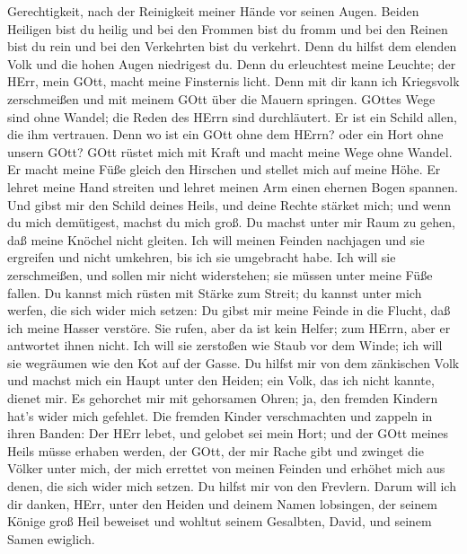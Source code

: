 Gerechtigkeit, nach der Reinigkeit meiner Hände vor seinen Augen.
 Beiden Heiligen bist du heilig und bei den Frommen bist du
fromm  und bei den Reinen bist du rein und bei den
Verkehrten bist du verkehrt.  Denn du hilfst dem elenden
Volk und die hohen Augen niedrigest du.  Denn du
erleuchtest meine Leuchte; der HErr, mein GOtt, macht meine Finsternis
licht.  Denn mit dir kann ich Kriegsvolk zerschmeißen und
mit meinem GOtt über die Mauern springen.  GOttes Wege sind
ohne Wandel; die Reden des HErrn sind durchläutert. Er ist ein Schild
allen, die ihm vertrauen.  Denn wo ist ein GOtt ohne dem
HErrn? oder ein Hort ohne unsern GOtt?  GOtt rüstet mich
mit Kraft und macht meine Wege ohne Wandel.  Er macht meine
Füße gleich den Hirschen und stellet mich auf meine Höhe. 
Er lehret meine Hand streiten und lehret meinen Arm einen ehernen Bogen
spannen.  Und gibst mir den Schild deines Heils, und deine
Rechte stärket mich; und wenn du mich demütigest, machst du mich groß.
 Du machst unter mir Raum zu gehen, daß meine Knöchel nicht
gleiten.  Ich will meinen Feinden nachjagen und sie
ergreifen und nicht umkehren, bis ich sie umgebracht habe. 
Ich will sie zerschmeißen, und sollen mir nicht widerstehen; sie müssen
unter meine Füße fallen.  Du kannst mich rüsten mit Stärke
zum Streit; du kannst unter mich werfen, die sich wider mich setzen:
 Du gibst mir meine Feinde in die Flucht, daß ich meine
Hasser verstöre.  Sie rufen, aber da ist kein Helfer; zum
HErrn, aber er antwortet ihnen nicht.  Ich will sie
zerstoßen wie Staub vor dem Winde; ich will sie wegräumen wie den Kot
auf der Gasse.  Du hilfst mir von dem zänkischen Volk und
machst mich ein Haupt unter den Heiden; ein Volk, das ich nicht kannte,
dienet mir.  Es gehorchet mir mit gehorsamen Ohren; ja, den
fremden Kindern hat's wider mich gefehlet.  Die fremden
Kinder verschmachten und zappeln in ihren Banden:  Der HErr
lebet, und gelobet sei mein Hort; und der GOtt meines Heils müsse
erhaben werden,  der GOtt, der mir Rache gibt und zwinget
die Völker unter mich,  der mich errettet von meinen
Feinden und erhöhet mich aus denen, die sich wider mich setzen. Du
hilfst mir von den Frevlern.  Darum will ich dir danken,
HErr, unter den Heiden und deinem Namen lobsingen,  der
seinem Könige groß Heil beweiset und wohltut seinem Gesalbten, David,
und seinem Samen ewiglich.

